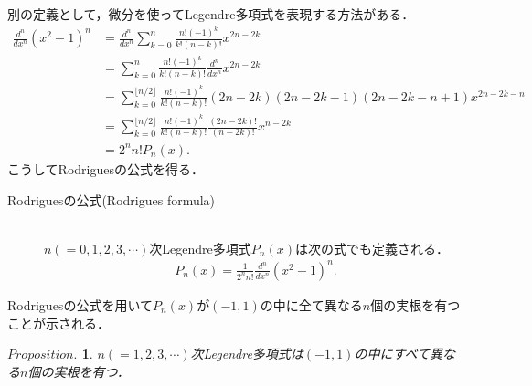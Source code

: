 \documentclass[a4j,papersize,disablejfam,slide,14pt]{jsarticle}
\newtheorem{Prop}{$Proposition.$}
\begin{document}
    別の定義として，微分を使って{\rm Legendre}多項式を表現する方法がある．
    \begin{align}
    	\frac{d^n}{dx^n}(x^2-1)^n &= \frac{d^n}{dx^n} \sum_{k=0}^{n} \frac{n! (-1)^k}{k! (n-k)!} x^{2n-2k} \\
        &= \sum_{k=0}^{n} \frac{n! (-1)^k}{k! (n-k)!} \frac{d^n}{dx^n} x^{2n-2k} \\
        &= \sum_{k=0}^{\lfloor n/2 \rfloor} \frac{n! (-1)^k}{k! (n-k)!} (2n-2k)(2n-2k-1)(2n-2k-n+1) x^{2n-2k-n} \\
        &= \sum_{k=0}^{\lfloor n/2 \rfloor} \frac{n! (-1)^k}{k! (n-k)!} \frac{(2n-2k)!}{(n-2k)!} x^{n-2k} \\
        &= 2^n n! P_n(x).
    \end{align}
    こうして{\rm Rodrigues}の公式を得る．
    \begin{screen}
    	\begin{description}
        	\item[{\rm Rodrigues}の公式({\rm Rodrigues formula})]\mbox{}\\
            $n(=0,1,2,3,\cdots)$次{\rm Legendre}多項式$P_n(x)$は次の式でも定義される．
            \begin{align}
            	P_n(x) = \frac{1}{2^n n!} \frac{d^n}{dx^n}(x^2-1)^n. \label{eq:rodrigues}
            \end{align}
        \end{description}
    \end{screen}
    {\rm Rodrigues}の公式を用いて$P_n(x)$が$(-1, 1)$の中に全て異なる$n$個の実根を有つことが示される．
    \begin{screen}
    	\begin{Prop}
        	$n(=1,2,3,\cdots)$次{\rm Legendre}多項式は$(-1, 1)$の中にすべて異なる$n$個の実根を有つ．
        \end{Prop}
    \end{screen}
\end{document}
